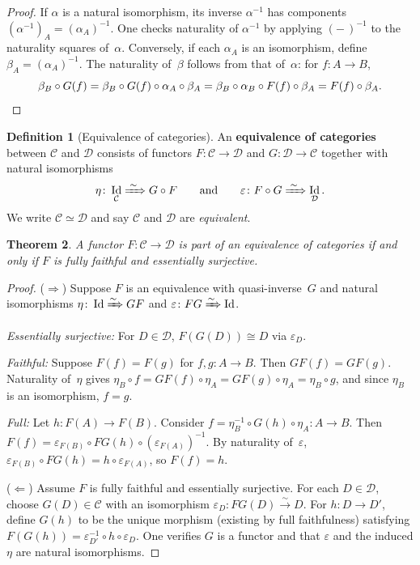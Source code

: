 \documentclass[a4paper,12pt]{book}
\DeclareMathOperator{\Id}{Id}
\theoremstyle{definition}
\newtheorem{definition}{Definition}[section]
\theoremstyle{plain}
\newtheorem{theorem}[definition]{Theorem}
\theoremstyle{remark}
\begin{document}
\begin{proof}
If $\alpha$ is a natural isomorphism, its inverse $\alpha^{-1}$ has
components $(\alpha^{-1})_A = (\alpha_A)^{-1}$.  One checks naturality
of $\alpha^{-1}$ by applying $(-\,)^{-1}$ to the naturality squares
of~$\alpha$.
Conversely, if each $\alpha_A$ is an isomorphism, define
$\beta_A = (\alpha_A)^{-1}$.  The naturality of~$\beta$ follows from
that of~$\alpha$: for $f\colon A\to B$,
\[
    \beta_B\circ G(f) = \beta_B\circ G(f)\circ\alpha_A\circ\beta_A
    = \beta_B\circ\alpha_B\circ F(f)\circ\beta_A
    = F(f)\circ\beta_A. \qedhere
\]
\end{proof}

\begin{definition}[Equivalence of categories]\label{def:equivalence}
An \textbf{equivalence of categories} between $\mathcal{C}$ and
$\mathcal{D}$ consists of functors
$F\colon\mathcal{C}\to\mathcal{D}$ and
$G\colon\mathcal{D}\to\mathcal{C}$ together with natural isomorphisms
\[
    \eta\colon\Id_\mathcal{C}\xRightarrow{\;\sim\;}G\circ F
    \qquad\text{and}\qquad
    \varepsilon\colon F\circ G\xRightarrow{\;\sim\;}\Id_\mathcal{D}.
\]
We write $\mathcal{C}\simeq\mathcal{D}$ and say $\mathcal{C}$ and
$\mathcal{D}$ are \emph{equivalent}.
\end{definition}

\begin{theorem}\label{thm:equiv-ff-eso}
A functor $F\colon\mathcal{C}\to\mathcal{D}$ is part of an equivalence
of categories if and only if $F$ is fully faithful and essentially
surjective.
\end{theorem}

\begin{proof}
($\Rightarrow$) Suppose $F$ is an equivalence with quasi-inverse~$G$ and
natural isomorphisms $\eta\colon\Id\xRightarrow{\sim} GF$ and
$\varepsilon\colon FG\xRightarrow{\sim}\Id$.

\emph{Essentially surjective:} For $D\in\mathcal{D}$,
$F(G(D))\cong D$ via $\varepsilon_D$.

\emph{Faithful:} Suppose $F(f)=F(g)$ for $f,g\colon A\to B$.
Then $GF(f)=GF(g)$.  Naturality of~$\eta$ gives
$\eta_B\circ f = GF(f)\circ\eta_A = GF(g)\circ\eta_A = \eta_B\circ g$,
and since $\eta_B$ is an isomorphism, $f=g$.

\emph{Full:} Let $h\colon F(A)\to F(B)$.  Consider
$f = \eta_B^{-1}\circ G(h)\circ\eta_A\colon A\to B$.
Then $F(f) = \varepsilon_{F(B)}\circ FG(h)\circ(\varepsilon_{F(A)})^{-1}$.
By naturality of~$\varepsilon$,
$\varepsilon_{F(B)}\circ FG(h) = h\circ\varepsilon_{F(A)}$,
so $F(f) = h$.

($\Leftarrow$)  Assume $F$ is fully faithful and essentially surjective.
For each $D\in\mathcal{D}$, choose $G(D)\in\mathcal{C}$ with an
isomorphism $\varepsilon_D\colon FG(D)\xrightarrow{\sim} D$.
For $h\colon D\to D'$, define $G(h)$ to be the unique morphism
(existing by full faithfulness) satisfying
$F(G(h)) = \varepsilon_{D'}^{-1}\circ h\circ\varepsilon_D$.
One verifies $G$ is a functor and that $\varepsilon$ and the induced
$\eta$ are natural isomorphisms.
\end{proof}
\end{document}
